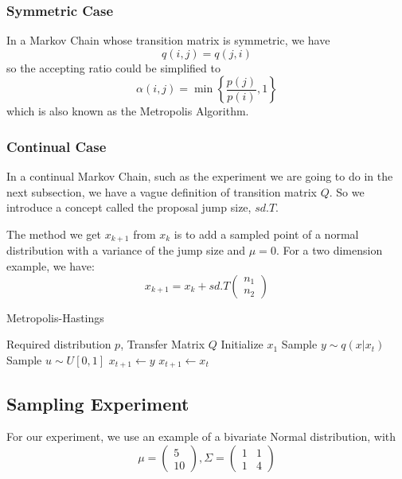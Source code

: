 \subsubsection{Symmetric Case}
In a Markov Chain whose transition matrix is symmetric, we have
$$q(i,j)=q(j,i)$$
so the accepting ratio could be simplified to 
\begin{equation}
\alpha(i,j) = \min\left\{\frac{p(j)}{p(i)},1\right\}
\end{equation}
which is also known as the Metropolis Algorithm\cite{metropolis1953equation}.

\subsubsection{Continual Case}
In a continual Markov Chain, such as the experiment we are going to do in the next subsection, we have a vague definition of transition matrix $Q$. So we introduce a concept called the proposal jump size, $sd.T$.

The method we get $x_{k+1}$ from $x_{k}$ is to add a sampled point of a normal distribution with a variance of the jump size and $\mu=0$. For a two dimension example, we have:
\begin{equation}
x_{k+1} = x_{k} + sd.T \left( \begin{array}{ccc}
n_{1} \\
n_{2} \end{array} \right) 
\end{equation}

	\begin{algorithm}
        \caption{Metropolis-Hastings}
        \begin{algorithmic}
        	\Require Required distribution $p$, Transfer Matrix $Q$
        	\State Initialize $x_{1}$ 
                \State Sample $y \sim q(x|x_{t})$
	            \State Sample $u \sim U{[0,1]}$
	                \State $x_{t+1} \gets y$
	            \Else
	            	\State $x_{t+1} \gets x_{t}$
	            \EndIf
			\EndFor
        \end{algorithmic}
    \end{algorithm}




\subsection{Sampling Experiment}
For our experiment, we use an example of a bivariate Normal distribution, with
$$ \mu = \left( \begin{array}{ccc}
5 \\
10 \end{array} \right), 
\Sigma = \left( \begin{array}{ccc}
1 & 1\\
1 & 4\end{array} \right)$$

